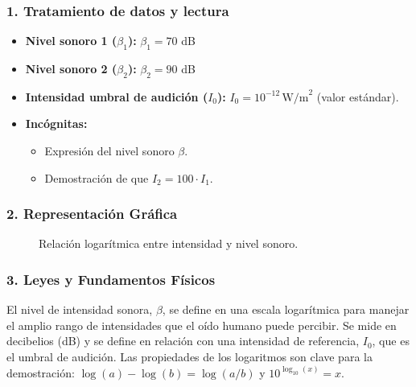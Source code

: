 \subsubsection*{1. Tratamiento de datos y lectura}
\begin{itemize}
    \item \textbf{Nivel sonoro 1 ($\beta_1$):} $\beta_1 = 70$ dB
    \item \textbf{Nivel sonoro 2 ($\beta_2$):} $\beta_2 = 90$ dB
    \item \textbf{Intensidad umbral de audición ($I_0$):} $I_0 = 10^{-12} \, \text{W/m}^2$ (valor estándar).
    \item \textbf{Incógnitas:}
    \begin{itemize}
        \item Expresión del nivel sonoro $\beta$.
        \item Demostración de que $I_2 = 100 \cdot I_1$.
    \end{itemize}
\end{itemize}

\subsubsection*{2. Representación Gráfica}
\begin{figure}[H]
    \centering
    \caption{Relación logarítmica entre intensidad y nivel sonoro.}
\end{figure}

\subsubsection*{3. Leyes y Fundamentos Físicos}
El nivel de intensidad sonora, $\beta$, se define en una escala logarítmica para manejar el amplio rango de intensidades que el oído humano puede percibir. Se mide en decibelios (dB) y se define en relación con una intensidad de referencia, $I_0$, que es el umbral de audición.
Las propiedades de los logaritmos son clave para la demostración: $\log(a) - \log(b) = \log(a/b)$ y $10^{\log_{10}(x)} = x$.

